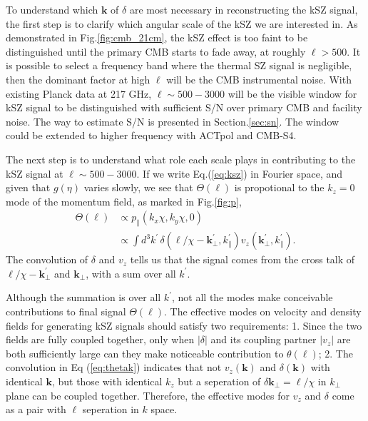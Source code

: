 \label{sec:kszAnalysis}
To understand which $\bm{k}$ of $\delta$ are most necessary in reconstructing the kSZ signal, the first step is to clarify which angular scale of the kSZ we are interested in. 
As demonstrated in Fig.\ref{fig:cmb_21cm}, the kSZ effect is too faint to be distinguished until the primary CMB starts to fade away, at roughly $\ell>500$. 
It is possible to select a frequency band where the thermal SZ signal is negligible, then the dominant factor at high $\ell$ will be the CMB instrumental noise.  With existing Planck \cite{Planck2015} data at 217 GHz, $\ell \sim 500-3000$ will be the visible window for kSZ signal to be distinguished with sufficient S/N over primary CMB and facility noise. The way to estimate S/N is presented in Section.\ref{sec:sn}. The window could be extended to higher frequency with ACTpol and CMB-S4. 

The next step is to understand what role each scale plays in contributing to the kSZ signal at $\ell \sim 500-3000$. If we write Eq.(\ref{eq:ksz}) in Fourier space, and given that $g(\eta)$ varies slowly, we see that $\Theta(\bm{\ell})$ is propotional to the $k_z=0$ mode of the momentum field, as marked in Fig.\ref{fig:p},
\begin{align}
    \label{eq:thetak}
    \Theta(\bm{\ell}) &\propto p_\parallel({k}_x\chi,{k}_y\chi,0)\\
     & \propto \int 
    d^3k^\prime\,\delta(\bm{\ell}/\chi-\bm{k}_\perp^\prime,k_\parallel^\prime) v_z(\bm{k_\perp^\prime},k_\parallel^\prime)\nonumber.
    \end{align}
The convolution of $\delta$ and $v_z$ tells us that the signal comes from the cross talk of $\bm{\ell}/\chi-\bm{k}_\perp^\prime$ and $\bm{k}_\perp$, with a sum over all $k^\prime$. 

Although the summation is over all $k^\prime$, not all the modes 
make conceivable contributions to final signal $\Theta(\bm{\ell})$.
The effective modes on velocity and density fields for 
generating kSZ signals should satisfy two requirements: 
1. Since the two fields are fully coupled together, 
only when $|\delta|$ and its coupling partner $|v_z|$ are both sufficiently large can they make noticeable contribution to $\theta(\bm{\ell})$; 
2. The convolution in Eq (\ref{eq:thetak}) indicates that  
not $v_z(\bm{k})$ and $\delta(\bm{k})$ with identical $\bm{k}$, 
but those  
with identical $k_z$ but a seperation of $\delta \bm{k_\perp}= \ell/\chi$ in 
$k_\perp$ plane can be coupled together. 
Therefore, the effective modes for $v_z$ and $\delta$ come as a pair with $\ell$ seperation in $k$ space. 

